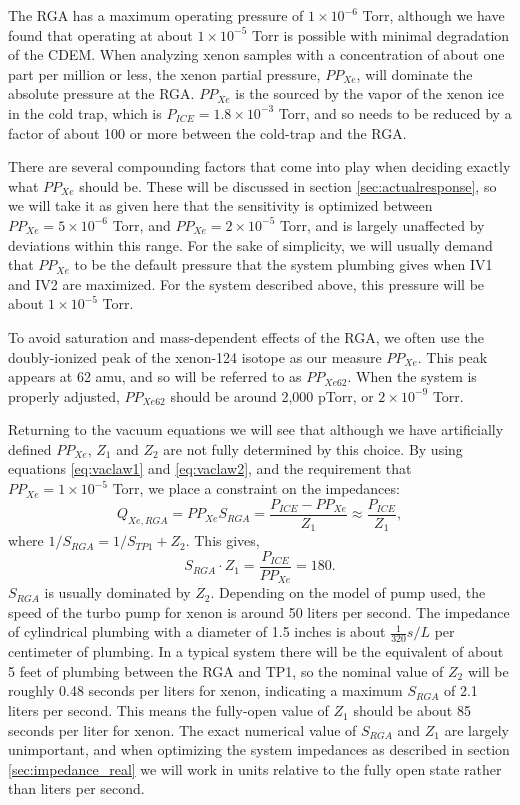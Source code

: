 The RGA has a maximum operating pressure of $1\times 10^{-6}$ Torr, although we have found that operating at about $1\times 10^{-5}$ Torr is possible with minimal degradation of the CDEM. When analyzing xenon samples with a concentration of about one part per million or less, the xenon partial pressure, $PP_{Xe}$,  will dominate the absolute pressure at the RGA. $PP_{Xe}$ is the sourced by the vapor of the xenon ice in the cold trap, which is $P_{ICE}=1.8\times 10^{-3}$ Torr, and so needs to be reduced by a factor of about 100 or more between the cold-trap and the RGA\cite{vaporpressure}. 

There are several compounding factors that come into play when deciding exactly what $PP_{Xe}$ should be. These will be discussed in section \ref{sec:actualresponse}, so we will take it as given here that the sensitivity is optimized between $PP_{Xe}=5\times10^{-6}$ Torr, and $PP_{Xe}=2\times10^{-5}$ Torr, and is largely unaffected by deviations within this range. For the sake of simplicity, we will usually demand that $PP_{Xe}$ to be the default pressure that the system plumbing gives when IV1 and IV2 are maximized. For the system described above, this pressure will be about $1\times 10^{-5}$ Torr. 

To avoid saturation and mass-dependent effects of the RGA, we often use the doubly-ionized peak of the xenon-124 isotope as our measure $PP_{Xe}$. This peak appears at 62 amu, and so will be referred to as $PP_{Xe62}$. When the system is properly adjusted, $PP_{Xe62}$ should be around 2,000 pTorr, or $2\times 10^{-9}$ Torr.

Returning to the vacuum equations we will see that although we have artificially defined $PP_{Xe}$, $Z_1$ and $Z_2$ are not fully determined by this choice. By using equations \ref{eq:vaclaw1} and \ref{eq:vaclaw2}, and the requirement that $PP_{Xe}=1\times 10^{-5}$ Torr, we place a constraint on the impedances:
\begin{equation}
\label{eq:xepres1}
Q_{Xe,RGA}=PP_{Xe}S_{RGA}=\frac{P_{ICE}-PP_{Xe}}{Z_1}\approx \frac{P_{ICE}}{Z_1},
\end{equation}
where $1/S_{RGA}=1/S_{TP1}+Z_2$. This gives,
\begin{equation}
\label{eq:impconstraint}
S_{RGA}\cdot Z_1= \frac{P_{ICE}}{PP_{Xe}} = 180.
\end{equation}
$S_{RGA}$ is usually dominated by $Z_2$. Depending on the model of pump used, the speed of the turbo pump for xenon is around 50 liters per second. The impedance of cylindrical plumbing with a diameter of 1.5 inches is about $\frac{1}{320} s/L$ per centimeter of plumbing\cite{vac_eq}. In a typical system there will be the equivalent of about 5 feet of plumbing between the RGA and TP1, so the nominal value of $Z_2$ will be roughly 0.48 seconds per liters for xenon, indicating a maximum $S_{RGA}$ of 2.1 liters per second\cite{vac_eq}. This means the fully-open value of $Z_1$ should be about 85 seconds per liter for xenon. The exact numerical value of $S_{RGA}$ and $Z_1$ are largely unimportant, and when optimizing the system impedances as described in section \ref{sec:impedance_real} we will work in units relative to the fully open state rather than liters per second.



